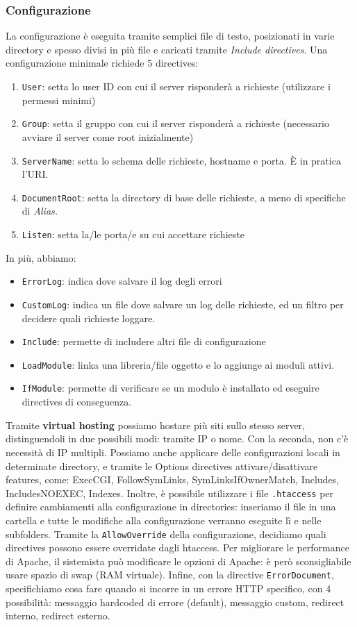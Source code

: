 \documentclass[11pt]{article}
\newcommand{\code}[1]{\texttt{#1}}
\begin{document}
\subsubsection{Configurazione}
La configurazione è eseguita tramite semplici file di testo, posizionati in varie directory e spesso divisi in più file e caricati tramite \textit{Include directives}. Una configurazione minimale richiede 5 directives:
\begin{enumerate}
    \item \code{User}: setta lo user ID con cui il server risponderà a richieste (utilizzare i permessi minimi)
    \item \code{Group}: setta il gruppo con cui il server risponderà a richieste (necessario avviare il server come root inizialmente)
    \item \code{ServerName}: setta lo schema delle richieste, hostname e porta. È in pratica l'URI.
    \item \code{DocumentRoot}: setta la directory di base delle richieste, a meno di specifiche di \textit{Alias.}
    \item \code{Listen}: setta la/le porta/e su cui accettare richieste
\end{enumerate}
In più, abbiamo:
\begin{itemize}
    \item \code{ErrorLog}: indica dove salvare il log degli errori
    \item \code{CustomLog}: indica un file dove salvare un log delle richieste, ed un filtro per decidere quali richieste loggare.
    \item \code{Include}: permette di includere altri file di configurazione
    \item \code{LoadModule}: linka una libreria/file oggetto e lo aggiunge ai moduli attivi.
    \item \code{IfModule}: permette di verificare se un modulo è installato ed eseguire directives di conseguenza.
\end{itemize}
Tramite \textbf{virtual hosting} possiamo hostare più siti sullo stesso server, distinguendoli in due possibili modi: tramite IP o nome. Con la seconda, non c'è necessità di IP multipli. 
Possiamo anche applicare delle configurazioni locali in determinate directory, e tramite le Options directives attivare/disattivare features, come: ExecCGI, FollowSymLinks, SymLinksIfOwnerMatch, Includes, IncludesNOEXEC, Indexes.
Inoltre, è possibile utilizzare i file \code{.htaccess} per definire cambiamenti alla configurazione in directories: inseriamo il file in una cartella e tutte le modifiche alla configurazione verranno eseguite lì e nelle subfolders. Tramite la \code{AllowOverride} della configurazione, decidiamo quali directives possono essere overridate dagli htaccess. Per migliorare le performance di Apache, il sistemista può modificare le opzioni di Apache: è però sconsigliabile usare spazio di swap (RAM virtuale). Infine, con la directive \code{ErrorDocument}, specifichiamo cosa fare quando si incorre in un errore HTTP specifico, con 4 possibilità: messaggio hardcoded di errore (default), messaggio custom, redirect interno, redirect esterno.
\end{document}
